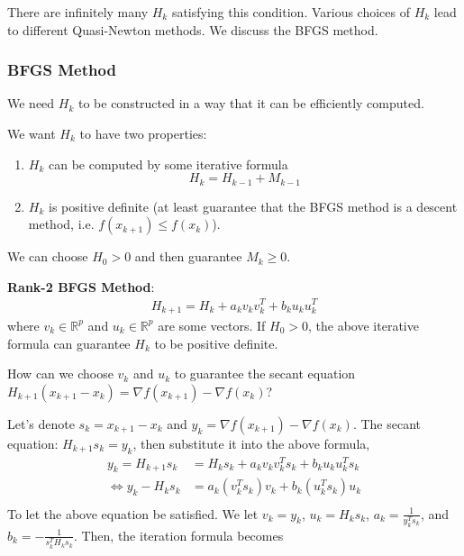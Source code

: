 \documentclass[11pt,a4paper]{article}
\begin{document}
There are infinitely many $H_k$ satisfying this condition. Various choices of $H_k$ lead to different Quasi-Newton methods. We discuss the BFGS method.

\subsubsection{BFGS Method}
We need $H_k$ to be constructed in a way that it can be efficiently computed.

We want $H_k$ to have two properties:
\begin{enumerate}[$(1)$]
    \item $H_k$ can be computed by some iterative formula $$H_k=H_{k-1}+M_{k-1}$$
    \item $H_k$ is positive definite (at least guarantee that the BFGS method is a descent method, i.e. $f(x_{k+1})\leq f(x_k)$).
\end{enumerate}
We can choose $H_0>0$ and then guarantee $M_k\geq 0$.

\textbf{Rank-2 BFGS Method}:
\begin{equation}
    \begin{aligned}
        H_{k+1}=H_k+a_kv_kv_k^T+b_ku_ku_k^T
    \end{aligned}
    \nonumber
\end{equation}
where $v_k\in \mathbb{R}^p$ and $u_k\in \mathbb{R}^p$ are some vectors. If $H_0>0$, the above iterative formula can guarantee $H_k$ to be positive definite.

How can we choose $v_k$ and $u_k$ to guarantee the secant equation $H_{k+1}(x_{k+1}-x_{k})=\nabla f(x_{k+1})-\nabla f(x_{k})$?

Let's denote $s_k=x_{k+1}-x_k$ and $y_k=\nabla f(x_{k+1})-\nabla f(x_k)$. The secant equation: $H_{k+1}s_k=y_k$, then substitute it into the above formula,
\begin{equation}
    \begin{aligned}
        y_{k}=H_{k+1}s_k&=H_ks_k+a_k v_k v_k^T s_k+b_ku_ku_k^Ts_k\\
        \Leftrightarrow y_{k}-H_ks_k&=a_k (v_k^T s_k)v_k+b_k(u_k^Ts_k)u_k\\
    \end{aligned}
    \nonumber
\end{equation}
To let the above equation be satisfied. We let $v_k=y_k$, $u_k=H_k s_k$, $a_k=\frac{1}{y_k^T s_k}$, and $b_k=-\frac{1}{s_k^TH_ks_k}$. Then, the iteration formula becomes
\begin{center}
\end{center}
\end{document}
